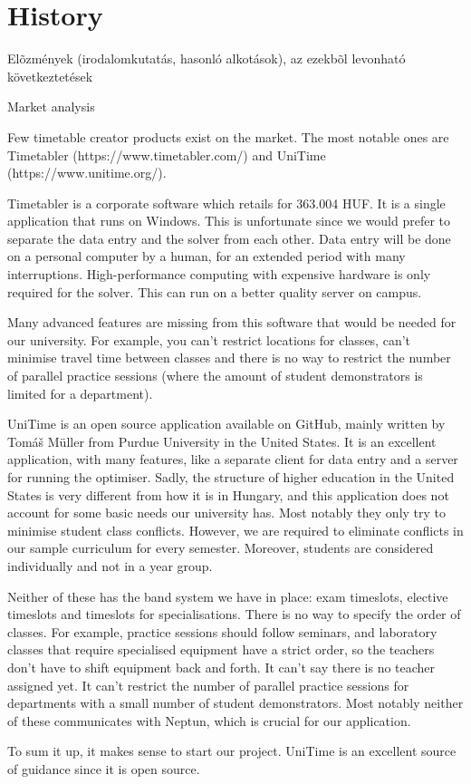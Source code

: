 \chapter{History}
Elõzmények (irodalomkutatás, hasonló alkotások), az ezekbõl levonható következtetések

Market analysis

Few timetable creator products exist on the market. The most notable ones are Timetabler (https://www.timetabler.com/) and UniTime (https://www.unitime.org/).

Timetabler is a corporate software which retails for 363.004 HUF. It is a single application that runs on Windows. This is unfortunate since we would prefer to separate the data entry and the solver from each other. Data entry will be done on a personal computer by a human, for an extended period with many interruptions. High-performance computing with expensive hardware is only required for the solver. This can run on a better quality server on campus.

Many advanced features are missing from this software that would be needed for our university. For example, you can't restrict locations for classes, can't minimise travel time between classes and there is no way to restrict the number of parallel practice sessions (where the amount of student demonstrators is limited for a department).

UniTime is an open source application available on GitHub, mainly written by Tomáš Müller from Purdue University in the United States. It is an excellent application, with many features, like a separate client for data entry and a server for running the optimiser. Sadly, the structure of higher education in the United States is very different from how it is in Hungary, and this application does not account for some basic needs our university has. Most notably they only try to minimise student class conflicts. However, we are required to eliminate conflicts in our sample curriculum for every semester. Moreover, students are considered individually and not in a year group.

Neither of these has the band system we have in place: exam timeslots, elective timeslots and timeslots for specialisations. There is no way to specify the order of classes. For example, practice sessions should follow seminars, and laboratory classes that require specialised equipment have a strict order, so the teachers don't have to shift equipment back and forth. It can't say there is no teacher assigned yet. It can't restrict the number of parallel practice sessions for departments with a small number of student demonstrators. Most notably neither of these communicates with Neptun, which is crucial for our application.

To sum it up, it makes sense to start our project. UniTime is an excellent source of guidance since it is open source.


